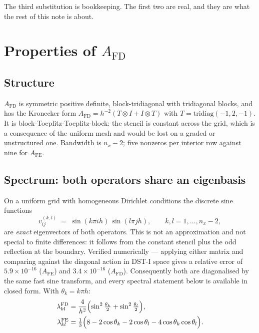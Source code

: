 \documentclass[11pt]{article}
\newcommand{\Afd}{A_{\mathrm{FD}}}
\newcommand{\Afe}{A_{\mathrm{FE}}}
\begin{document}
The third substitution is bookkeeping. The first two are real, and they are what the rest of this
note is about.

\section{Properties of \texorpdfstring{$\Afd$}{A\_FD}}

\subsection{Structure}

$\Afd$ is symmetric positive definite, block-tridiagonal with tridiagonal blocks, and has the
Kronecker form $\Afd = h^{-2}(T\otimes I + I\otimes T)$ with $T=\mathrm{tridiag}(-1,2,-1)$. It is
block-Toeplitz-Toeplitz-block: the stencil is constant across the grid, which is a consequence of
the uniform mesh and would be lost on a graded or unstructured one. Bandwidth is $n_x-2$;
five nonzeros per interior row against nine for $\Afe$.

\subsection{Spectrum: both operators share an eigenbasis}

On a uniform grid with homogeneous Dirichlet conditions the discrete sine functions
\begin{equation}
  v^{(k,l)}_{ij} \;=\; \sin(k\pi i h)\,\sin(l\pi j h), \qquad k,l = 1,\dots,n_x-2,
\end{equation}
are \emph{exact} eigenvectors of both operators. This is not an approximation and not special to
finite differences: it follows from the constant stencil plus the odd reflection at the boundary.
Verified numerically --- applying either matrix and comparing against the diagonal action in
DST-I space gives a relative error of $5.9\times10^{-16}$ ($\Afe$) and $3.4\times10^{-16}$
($\Afd$). Consequently both are diagonalised by the same fast sine transform, and every spectral
statement below is available in closed form. With $\theta_k = k\pi h$:
\begin{align}
  \lambda^{\mathrm{FD}}_{kl}
    &= \frac{4}{h^2}\Bigl( \sin^2\tfrac{\theta_k}{2} + \sin^2\tfrac{\theta_l}{2} \Bigr), \\
  \lambda^{\mathrm{FE}}_{kl}
    &= \tfrac13\Bigl( 8 - 2\cos\theta_k - 2\cos\theta_l - 4\cos\theta_k\cos\theta_l \Bigr).
\end{align}
\end{document}
